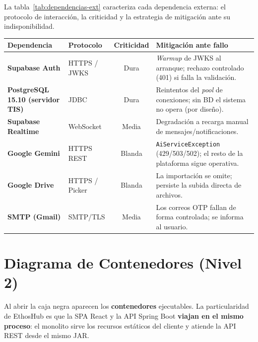 La tabla~\ref{tab:dependencias-ext} caracteriza cada dependencia externa: el protocolo
de interacción, la criticidad y la estrategia de mitigación ante su indisponibilidad.

\vspace{0.2cm}
\noindent
\renewcommand{\arraystretch}{1.3}
\fontsize{8.5}{10.2}\selectfont\sffamily
\begin{tabularx}{\textwidth}{|>{\bfseries\color{colorPrimario}}l|l|c|X|}
\hline
\rowcolor{headerTabla}
\textbf{Dependencia} & \textbf{Protocolo} & \textbf{Criticidad} & \textbf{Mitigación ante fallo} \\
\hline
Supabase Auth & HTTPS / JWKS & Dura & \textit{Warmup} de JWKS al arranque; rechazo controlado (401) si falla la validación. \\
\hline
\rowcolor{grisTecnico}
PostgreSQL 15.10 (servidor TIS) & JDBC & Dura & Reintentos del \textit{pool} de conexiones; sin BD el sistema no opera (por diseño). \\
\hline
Supabase Realtime & WebSocket & Media & Degradación a recarga manual de mensajes/notificaciones. \\
\hline
\rowcolor{grisTecnico}
Google Gemini & HTTPS REST & Blanda & \texttt{AiServiceException} (429/503/502); el resto de la plataforma sigue operativa. \\
\hline
Google Drive & HTTPS / Picker & Blanda & La importación se omite; persiste la subida directa de archivos. \\
\hline
\rowcolor{grisTecnico}
SMTP (Gmail) & SMTP/TLS & Media & Los correos OTP fallan de forma controlada; se informa al usuario. \\
\hline
\end{tabularx}
\label{tab:dependencias-ext}

\section{Diagrama de Contenedores (Nivel 2)}
\label{sec:c4_contenedores}

Al abrir la caja negra aparecen los \textbf{contenedores} ejecutables. La
particularidad de EthosHub es que la SPA React y la API Spring Boot \textbf{viajan en
el mismo proceso}: el monolito sirve los recursos estáticos del cliente y atiende la
API REST desde el mismo JAR.

